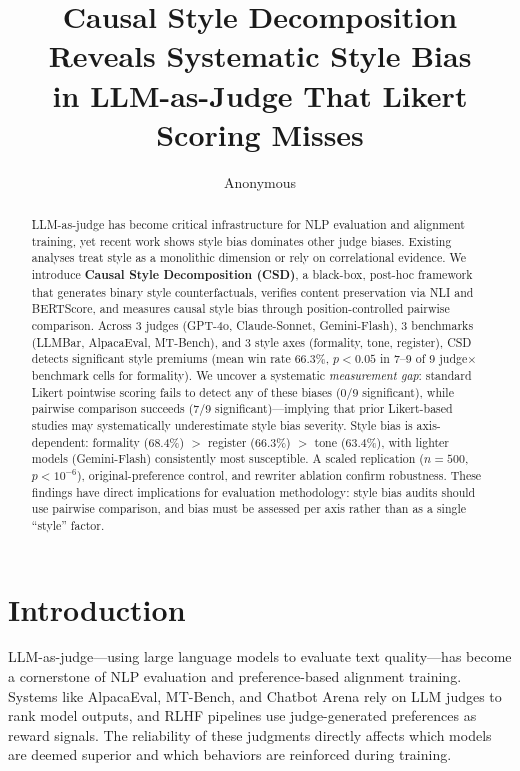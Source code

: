 \documentclass[11pt,a4paper]{article}
\title{Causal Style Decomposition Reveals Systematic Style Bias\\in LLM-as-Judge That Likert Scoring Misses}
\author{Anonymous}
\date{}
\begin{document}
\maketitle

\begin{abstract}
LLM-as-judge has become critical infrastructure for NLP evaluation and alignment training, yet recent work shows style bias dominates other judge biases.
Existing analyses treat style as a monolithic dimension or rely on correlational evidence.
We introduce \textbf{Causal Style Decomposition (CSD)}, a black-box, post-hoc framework that generates binary style counterfactuals, verifies content preservation via NLI and BERTScore, and measures causal style bias through position-controlled pairwise comparison.
Across 3 judges (GPT-4o, Claude-Sonnet, Gemini-Flash), 3 benchmarks (LLMBar, AlpacaEval, MT-Bench), and 3 style axes (formality, tone, register), CSD detects significant style premiums (mean win rate 66.3\%, $p<0.05$ in 7--9 of 9 judge$\times$benchmark cells for formality).
We uncover a systematic \emph{measurement gap}: standard Likert pointwise scoring fails to detect any of these biases (0/9 significant), while pairwise comparison succeeds (7/9 significant)---implying that prior Likert-based studies may systematically underestimate style bias severity.
Style bias is axis-dependent: formality (68.4\%) $>$ register (66.3\%) $>$ tone (63.4\%), with lighter models (Gemini-Flash) consistently most susceptible.
A scaled replication ($n=500$, $p<10^{-6}$), original-preference control, and rewriter ablation confirm robustness.
These findings have direct implications for evaluation methodology: style bias audits should use pairwise comparison, and bias must be assessed per axis rather than as a single ``style'' factor.
\end{abstract}

\section{Introduction}

LLM-as-judge---using large language models to evaluate text quality---has become a cornerstone of NLP evaluation and preference-based alignment training.
Systems like AlpacaEval, MT-Bench, and Chatbot Arena rely on LLM judges to rank model outputs, and RLHF pipelines use judge-generated preferences as reward signals.
The reliability of these judgments directly affects which models are deemed superior and which behaviors are reinforced during training.
\end{document}
